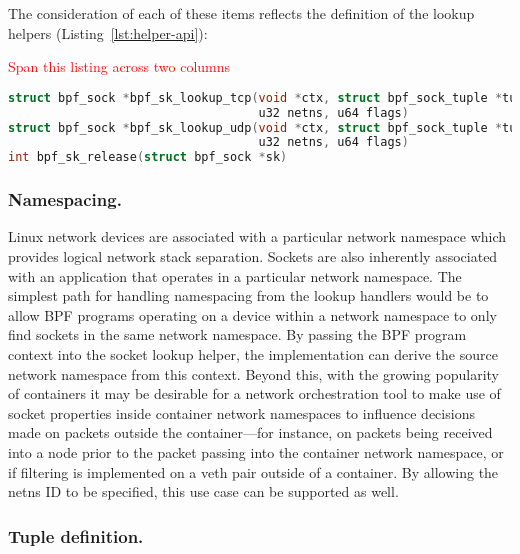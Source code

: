 \documentclass[10pt,sigconf,authorversion]{lpc}
\newcommand\todo[1]{\textcolor{red}{#1}}
\begin{document}
The consideration of each of these items reflects the definition of the lookup
helpers (Listing~\ref{lst:helper-api}):

\todo{Span this listing across two columns}
\begin{lstlisting}[caption={BPF API helper functions for socket lookup},language=c,label=lst:helper-api,breaklines=true]
struct bpf_sock *bpf_sk_lookup_tcp(void *ctx, struct bpf_sock_tuple *tuple, u32 tuple_size,
                                   u32 netns, u64 flags)
struct bpf_sock *bpf_sk_lookup_udp(void *ctx, struct bpf_sock_tuple *tuple, u32 tuple_size,
                                   u32 netns, u64 flags)
int bpf_sk_release(struct bpf_sock *sk)
\end{lstlisting}

\subsubsection{Namespacing.}

Linux network devices are associated with a particular network namespace which
provides logical network stack separation. Sockets are also inherently
associated with an application that operates in a particular network namespace.
The simplest path for handling namespacing from the lookup handlers would be to
allow BPF programs operating on a device within a network namespace to only
find sockets in the same network namespace. By passing the BPF program context
into the socket lookup helper, the implementation can derive the source network
namespace from this context. Beyond this, with the growing popularity of
containers it may be desirable for a network orchestration tool to make use of
socket properties inside container network namespaces to influence decisions
made on packets outside the container---for instance, on packets being received
into a node prior to the packet passing into the container network namespace,
or if filtering is implemented on a veth pair outside of a container. By
allowing the netns ID to be specified, this use case can be supported as well.

\subsubsection{Tuple definition.}
\end{document}
